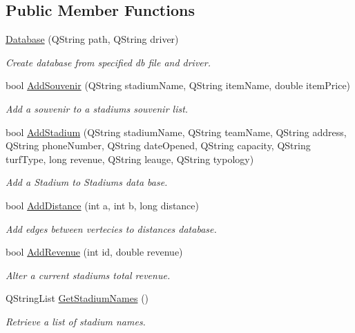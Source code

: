 \subsection*{Public Member Functions}
\begin{DoxyCompactItemize}
\item 
\hyperlink{class_database_a39f80fe1b43e44d840487fbe80034ff5}{Database} (Q\+String path, Q\+String driver)
\begin{DoxyCompactList}\small\item\em Create database from specified db file and driver. \end{DoxyCompactList}\item 
bool \hyperlink{class_database_a427744572ef7ae7489cb98d0638d3147}{Add\+Souvenir} (Q\+String stadium\+Name, Q\+String item\+Name, double item\+Price)
\begin{DoxyCompactList}\small\item\em Add a souvenir to a stadium\textquotesingle{}s souvenir list. \end{DoxyCompactList}\item 
bool \hyperlink{class_database_a6ce5328c14654001dc00760e8aa051dd}{Add\+Stadium} (Q\+String stadium\+Name, Q\+String team\+Name, Q\+String address, Q\+String phone\+Number, Q\+String date\+Opened, Q\+String capacity, Q\+String turf\+Type, long revenue, Q\+String leauge, Q\+String typology)
\begin{DoxyCompactList}\small\item\em Add a Stadium to Stadium\textquotesingle{}s data base. \end{DoxyCompactList}\item 
bool \hyperlink{class_database_a9b9d910bc03a31b4ba8a0247f4d87e35}{Add\+Distance} (int a, int b, long distance)
\begin{DoxyCompactList}\small\item\em Add edges between vertecies to distances database. \end{DoxyCompactList}\item 
bool \hyperlink{class_database_a7af2402bcaac82c92eb9954dc7435d32}{Add\+Revenue} (int id, double revenue)
\begin{DoxyCompactList}\small\item\em Alter a current stadium\textquotesingle{}s total revenue. \end{DoxyCompactList}\item 
Q\+String\+List \hyperlink{class_database_ae4ea1141f1aa1651da8854c4f16a5f00}{Get\+Stadium\+Names} ()
\begin{DoxyCompactList}\small\item\em Retrieve a list of stadium names. \end{DoxyCompactList}\item 

\end{DoxyCompactItemize}
